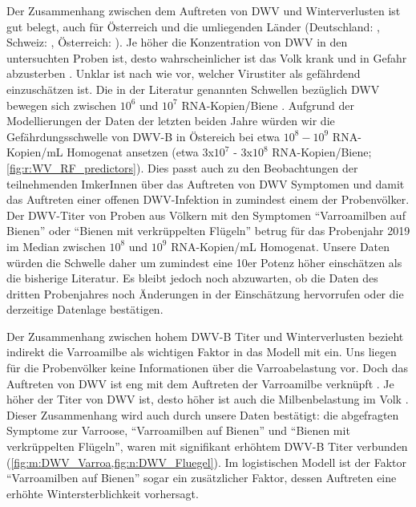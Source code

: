 Der Zusammenhang zwischen dem Auftreten von DWV und Winterverlusten ist gut belegt, auch für Österreich und die umliegenden Länder (Deutschland: \cite{genersch2010}, Schweiz: \cite{dainat2012}, Österreich: \cite{morawetz2018}). Je höher die Konzentration von DWV in den untersuchten Proben ist, desto wahrscheinlicher ist das Volk krank und in Gefahr abzusterben \citep{amiri2015,berthoud2010,barroso-arevalo2019,dainat2012}. Unklar ist nach wie vor, welcher Virustiter als gefährdend einzuschätzen ist. Die in der Literatur genannten Schwellen bezüglich DWV bewegen sich zwischen $10^6$ und $10^7$ RNA-Kopien/Biene \citep{amiri2015,barroso-arevalo2019,möckel2011,schurr2019}. Aufgrund der Modellierungen der Daten der letzten beiden Jahre würden wir die Gefährdungsschwelle von DWV-B in Östereich bei etwa $10^8 - 10^9$ RNA-Kopien/\si{\milli\liter} Homogenat ansetzen (etwa 3x$10^7$ - 3x$10^8$ RNA-Kopien/Biene; \cref{fig:r:WV_RF_predictors}). Dies passt auch zu den Beobachtungen der teilnehmenden ImkerInnen über das Auftreten von DWV Symptomen und damit das Auftreten einer offenen DWV-Infektion in zumindest einem der Probenvölker. Der DWV-Titer von Proben aus Völkern mit den Symptomen \enquote{Varroamilben auf Bienen} oder \enquote{Bienen mit verkrüppelten Flügeln} betrug für das Probenjahr 2019 im Median zwischen $10^8$ und $10^9$ RNA-Kopien/\si{\milli\liter} Homogenat. Unsere Daten würden die Schwelle daher um zumindest eine 10er Potenz höher einschätzen als die bisherige Literatur. Es bleibt jedoch noch abzuwarten, ob die Daten des dritten Probenjahres noch Änderungen in der Einschätzung hervorrufen oder die derzeitige Datenlage bestätigen.

Der Zusammenhang zwischen hohem DWV-B Titer und Winterverlusten bezieht indirekt die Varroamilbe als wichtigen Faktor in das Modell mit ein. Uns liegen für die Probenvölker keine Informationen über die Varroabelastung vor. Doch das Auftreten von DWV ist eng mit dem Auftreten der Varroamilbe verknüpft \citep{bowen-walker1999,dainat2013,gisder2009}. Je höher der Titer von DWV ist, desto höher ist auch die Milbenbelastung im Volk \citep{barroso-arevalo2019}. Dieser Zusammenhang wird auch durch unsere Daten bestätigt: die abgefragten Symptome zur Varroose, \enquote{Varroamilben auf Bienen} und \enquote{Bienen mit verkrüppelten Flügeln}, waren mit signifikant erhöhtem DWV-B Titer verbunden (\cref{fig:m:DWV_Varroa,fig:n:DWV_Fluegel}). Im logistischen Modell ist der Faktor \enquote{Varroamilben auf Bienen} sogar ein zusätzlicher Faktor, dessen Auftreten eine erhöhte Wintersterblichkeit vorhersagt.

